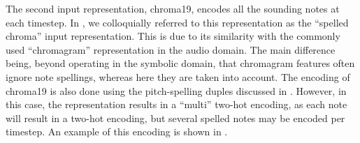 
The second input representation, \gls{chroma19}, encodes all
the sounding notes at each timestep. In
\textcite{napoleslopez2021augmentednet}, we colloquially
referred to this representation as the ``spelled chroma''
input representation. This is due to its similarity with the
commonly used ``chromagram'' representation in the audio
domain. The main difference being, beyond operating in the
symbolic domain, that chromagram features often ignore note
spellings, whereas here they are taken into account. The
encoding of \gls{chroma19} is also done using the
pitch-spelling duples discussed in
. However, in this case, the
representation results in a ``multi'' two-hot encoding, as
each note will result in a two-hot encoding, but several
spelled notes may be encoded per timestep. An example of
this encoding is shown in .

